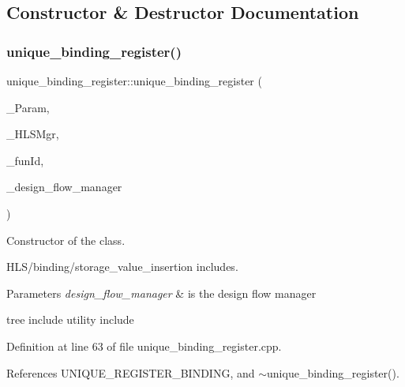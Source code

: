 \subsection{Constructor \& Destructor Documentation}
\mbox{\label{classunique__binding__register_a2b450419dc8f29e7d75d5898d783d6d5}} 
\subsubsection{\texorpdfstring{unique\+\_\+binding\+\_\+register()}{unique\_binding\_register()}}
{\footnotesize\ttfamily unique\+\_\+binding\+\_\+register\+::unique\+\_\+binding\+\_\+register (\begin{DoxyParamCaption}\item[{const \hyperlink{Parameter_8hpp_a37841774a6fcb479b597fdf8955eb4ea}{Parameter\+Const\+Ref}}]{\+\_\+\+Param,  }\item[{const \hyperlink{hls__manager_8hpp_acd3842b8589fe52c08fc0b2fcc813bfe}{H\+L\+S\+\_\+manager\+Ref}}]{\+\_\+\+H\+L\+S\+Mgr,  }\item[{unsigned int}]{\+\_\+fun\+Id,  }\item[{const Design\+Flow\+Manager\+Const\+Ref}]{\+\_\+design\+\_\+flow\+\_\+manager }\end{DoxyParamCaption})}



Constructor of the class. 

H\+L\+S/binding/storage\+\_\+value\+\_\+insertion includes.


\begin{DoxyParams}{Parameters}
{\em design\+\_\+flow\+\_\+manager} & is the design flow manager\\
\hline
\end{DoxyParams}
tree include utility include 

Definition at line 63 of file unique\+\_\+binding\+\_\+register.\+cpp.



References U\+N\+I\+Q\+U\+E\+\_\+\+R\+E\+G\+I\+S\+T\+E\+R\+\_\+\+B\+I\+N\+D\+I\+NG, and $\sim$unique\+\_\+binding\+\_\+register().

